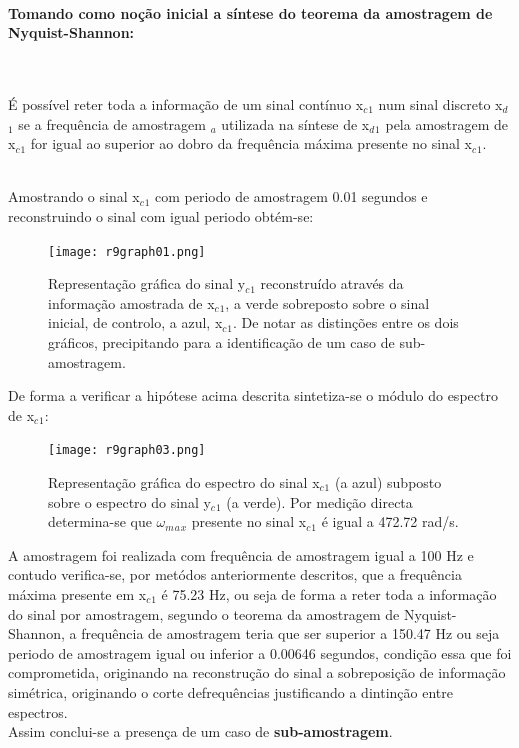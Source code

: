 \documentclass[a4paper,12pt]{article}
\begin{document}
                        \paragraph{Tomando como noção inicial a síntese do teorema da amostragem de Nyquist-Shannon:}
			\mbox{}\\
			\begin{center}
				É possível reter toda a informação de um sinal contínuo x$_c$$_1$ num sinal discreto x$_d$$_1$ se a frequência de amostragem $_a$ utilizada na síntese de x$_d$$_1$ pela amostragem de x$_c$$_1$ for igual ao superior ao dobro da frequência máxima presente no sinal x$_c$$_1$.
			\end{center}
			\mbox{}\\
			Amostrando o sinal x$_c$$_1$ com periodo de amostragem 0.01 segundos e reconstruindo o sinal com igual periodo obtém-se:
			\begin{figure}[H]
                                    \centering
                                    \captionsetup{justification=centering}
                                    \texttt{[image: r9graph01.png]}
                                \caption{Representação gráfica do sinal y$_c$$_1$ reconstruído através da informação amostrada de x$_c$$_1$, a verde sobreposto sobre o sinal inicial, de controlo, a azul, x$_c$$_1$. De notar as distinções entre os dois gráficos, precipitando para a identificação de um caso de sub-amostragem.}
                            \end{figure}
			\newpage
			De forma a verificar a hipótese acima descrita sintetiza-se o módulo do espectro de x$_c$$_1$:
				\begin{figure}[H]
                                      \centering
                                      \captionsetup{justification=centering}
                                      \texttt{[image: r9graph03.png]}
                                  \caption{Representação gráfica do espectro do sinal x$_c$$_1$ (a azul) subposto sobre o espectro do sinal y$_c$$_1$ (a verde). Por medição directa determina-se que $\omega$$_m$$_a$$_x$ presente no sinal x$_c$$_1$ é igual a 472.72 rad/s.}
                              \end{figure}
			A amostragem foi realizada com frequência de amostragem igual a 100 Hz e contudo verifica-se, por metódos anteriormente descritos, que a frequência máxima presente em x$_c$$_1$ é 75.23 Hz, ou seja de forma a reter toda a informação do sinal por amostragem, segundo o teorema da amostragem de Nyquist-Shannon, a frequência de amostragem teria que ser superior a 150.47 Hz ou seja periodo de amostragem igual ou inferior a 0.00646 segundos, condição essa que foi comprometida, originando na reconstrução do sinal a sobreposição de informação simétrica, originando o corte defrequências justificando a dintinção entre espectros.\\
			Assim conclui-se a presença de um caso de \textbf{sub-amostragem}.
	\newpage
		
		
		\nocite{ss}
		
	
\end{document}
